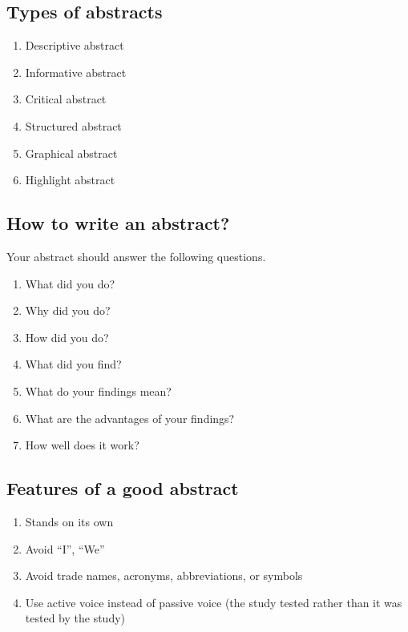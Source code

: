 \documentclass[
  letterpaper,
  DIV=11,
  numbers=noendperiod]{scrreprt}
\begin{document}
\subsection{Types of abstracts}\label{types-of-abstracts}

\begin{enumerate}
\def\labelenumi{\arabic{enumi}.}
\item
  Descriptive abstract
\item
  Informative abstract
\item
  Critical abstract
\item
  Structured abstract
\item
  Graphical abstract
\item
  Highlight abstract
\end{enumerate}

\subsection{How to write an abstract?}\label{how-to-write-an-abstract}

Your abstract should answer the following questions.

\begin{enumerate}
\def\labelenumi{\arabic{enumi}.}
\item
  What did you do?
\item
  Why did you do?
\item
  How did you do?
\item
  What did you find?
\item
  What do your findings mean?
\item
  What are the advantages of your findings?
\item
  How well does it work?
\end{enumerate}

\subsection{Features of a good
abstract}\label{features-of-a-good-abstract}

\begin{enumerate}
\def\labelenumi{\arabic{enumi}.}
\item
  Stands on its own
\item
  Avoid ``I'', ``We''
\item
  Avoid trade names, acronyms, abbreviations, or symbols
\item
  Use active voice instead of passive voice (the study tested rather
  than it was tested by the study)
\end{enumerate}
\end{document}
